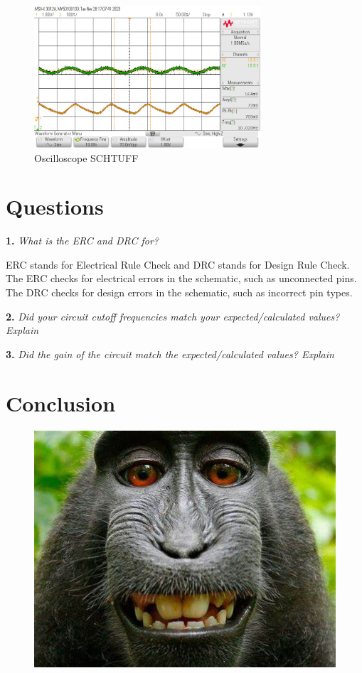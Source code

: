 \documentclass[CMPE]{KGCOEReport}
\begin{document}
\begin{figure}[H]
    \centering
    \includegraphics[width=0.75\textwidth]{10Hz.png}
    \caption{Oscilloscope SCHTUFF}
    \label{fig:10HzCapture}
\end{figure}

\section*{Questions}

\textbf{1.} \emph{What is the ERC and DRC for?}

ERC stands for Electrical Rule Check and DRC stands for Design Rule Check. The ERC checks for electrical errors in the schematic, such as unconnected pins. The DRC checks for design errors in the schematic, such as incorrect pin types.

\bigskip

\textbf{2.} \emph{Did your circuit cutoff frequencies match your expected/calculated values? Explain}

\bigskip

\textbf{3.} \emph{Did the gain of the circuit match the expected/calculated values? Explain}

\section*{Conclusion}

\newpage
\begin{figure}[H]
    \centering
    \begin{adjustbox}{center}
        \includegraphics[width=1.26\textwidth]{signoff.pdf}
    \end{adjustbox}
\end{figure}
\end{document}
